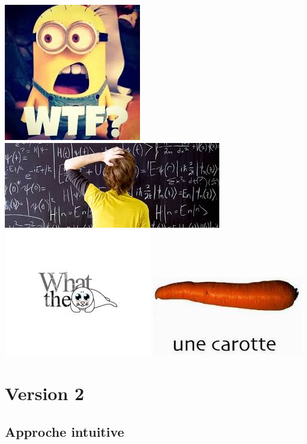 \documentclass{42}
\begin{document}
\begin{center}
	\includegraphics[scale=0.35]{what5}
	\includegraphics[scale=0.35]{what6}
	\includegraphics[scale=0.35]{what7}
	\includegraphics[scale=0.35]{what8}
\end{center}

\newpage
\section{Version 2}

\subsection{Approche intuitive}
\end{document}
